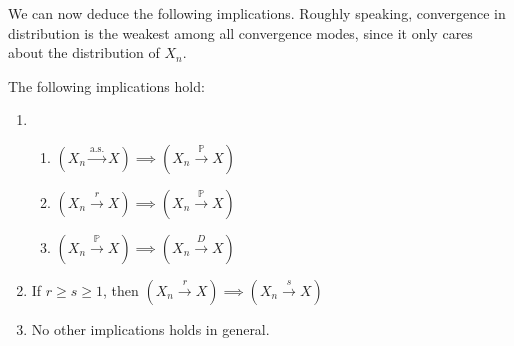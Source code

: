 \documentclass{huhtakm-template-book}
\newcommand{\prob}{\mathbb{P}}
\begin{document}
We can now deduce the following implications. Roughly speaking, convergence in distribution is the weakest among all convergence modes, since it only cares about the distribution of $X_{n}$.
\begin{thm}
    \label{Chapter 7 Theorem implications of different convergence modes}
    The following implications hold:
    \begin{enumerate}
        \item \begin{enumerate}
            \item $(X_{n}\xrightarrow{\text{a.s.}}X)\implies(X_{n}\xrightarrow{\prob}X)$
            \item $(X_{n}\xrightarrow{r}X)\implies(X_{n}\xrightarrow{\prob}X)$
            \item $(X_{n}\xrightarrow{\prob}X)\implies(X_{n}\xrightarrow{D}X)$
        \end{enumerate}
        \item If $r\geq s\geq 1$, then $(X_{n}\xrightarrow{r}X)\implies(X_{n}\xrightarrow{s}X)$
        \item No other implications holds in general.
    \end{enumerate}
\end{thm}
\newpage
\end{document}
